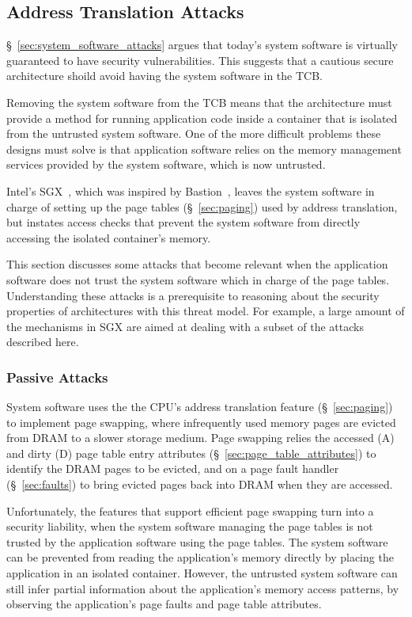 \subsection{Address Translation Attacks}
\label{sec:paging_attacks}

\S~\ref{sec:system_software_attacks} argues that today's system software is
virtually guaranteed to have security vulnerabilities. This suggests that a
cautious secure architecture shoild avoid having the system software in the
TCB.

Removing the system software from the TCB means that the architecture must
provide a method for running application code inside a container that is
isolated from the untrusted system software. One of the more difficult problems
these designs must solve is that application software relies on the memory
management services provided by the system software, which is now untrusted.

Intel's SGX~\cite{mckeen2013sgx, anati2013sgx}, which was inspired by
Bastion~\cite{champagne2010bastion}, leaves the system software in charge of
setting up the page tables (\S~\ref{sec:paging}) used by address translation,
but instates access checks that prevent the system software from directly
accessing the isolated container's memory.

This section discusses some attacks that become relevant when the application
software does not trust the system software which in charge of the page tables.
Understanding these attacks is a prerequisite to reasoning about the security
properties of architectures with this threat model. For example, a large amount
of the mechanisms in SGX are aimed at dealing with a subset of the attacks
described here.


\subsubsection{Passive Attacks}
\label{sec:fault_tracking_attacks}

System software uses the the CPU's address translation feature
(\S~\ref{sec:paging}) to implement page swapping, where infrequently used
memory pages are evicted from DRAM to a slower storage medium. Page swapping
relies the accessed (A) and dirty (D) page table entry attributes
(\S~\ref{sec:page_table_attributes}) to identify the DRAM pages to be evicted,
and on a page fault handler (\S~\ref{sec:faults}) to bring evicted pages back
into DRAM when they are accessed.

Unfortunately, the features that support efficient page swapping turn into a
security liability, when the system software managing the page tables is not
trusted by the application software using the page tables. The system software
can be prevented from reading the application's memory directly by placing the
application in an isolated container. However, the untrusted system software
can still infer partial information about the application's memory access
patterns, by observing the application's page faults and page table attributes.

